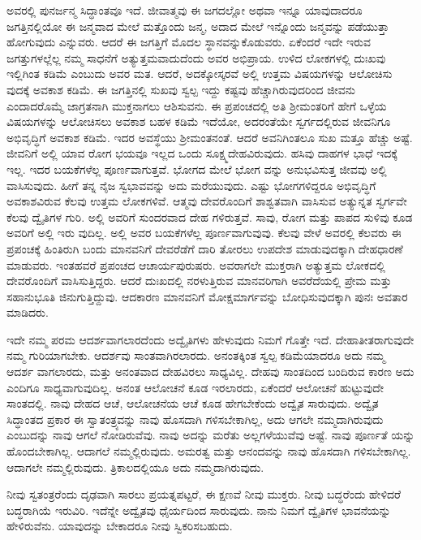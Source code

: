 ಅವರಲ್ಲಿ ಪುನರ್ಜನ್ಮ ಸಿದ್ಧಾಂತವೂ ಇದೆ. ಜೀವಾತ್ಮವು ಈ ಜಗದಲ್ಲೋ ಅಥವಾ ಇನ್ನೂ ಯಾವುದಾದರೂ ಜಗತ್ತಿನಲ್ಲಿಯೋ ಈ ಜನ್ಮವಾದ ಮೇಲೆ ಮತ್ತೊಂದು ಜನ್ಮ, ಅದಾದ ಮೇಲೆ ಇನ್ನೊಂದು ಜನ್ಮವನ್ನು ಪಡೆಯುತ್ತಾ ಹೋಗುವುದು ಎನ್ನುವರು. ಆದರೆ ಈ ಜಗತ್ತಿಗೆ ಮೊದಲ ಸ್ಥಾನವನ್ನುಕೊಡುವರು. ಏಕೆಂದರೆ ಇದೇ ಇರುವ ಜಗತ್ತುಗಳಲ್ಲೆಲ್ಲ ನಮ್ಮ ಸಾಧನೆಗೆ ಅತ್ಯುತ್ತಮವಾದುದೆಂದು ಅವರ ಅಭಿಪ್ರಾಯ. ಉಳಿದ ಲೋಕಗಳಲ್ಲಿ ದುಃಖವು ಇಲ್ಲಿಗಿಂತ ಕಡಿಮೆ ಎಂಬುದು ಅವರ ಮತ. ಆದರೆ, ಅದಕ್ಕೋಸ್ಕರವೆ ಅಲ್ಲಿ ಉತ್ತಮ ವಿಷಯಗಳನ್ನು ಆಲೋಚಿಸು ವುದಕ್ಕೆ ಅವಕಾಶ ಕಡಿಮೆ. ಈ ಜಗತ್ತಿನಲ್ಲಿ ಸುಖವು ಸ್ವಲ್ಪ ಇದ್ದು ಕಷ್ಟವು ಹೆಚ್ಚಾಗಿರುವುದರಿಂದ ಜೀವನು ಎಂದಾದರೊಮ್ಮೆ ಜಾಗ್ರತನಾಗಿ ಮುಕ್ತನಾಗಲು ಆಶಿಸುವನು. ಈ ಪ್ರಪಂಚದಲ್ಲಿ ಅತಿ ಶ‍್ರೀಮಂತರಿಗೆ ಹೇಗೆ ಒಳ್ಳೆಯ ವಿಷಯಗಳನ್ನು ಆಲೋಚಿಸಲು ಅವಕಾಶ ಬಹಳ ಕಡಿಮೆ ಇದೆಯೋ, ಅದರಂತೆಯೇ ಸ್ವರ್ಗದಲ್ಲಿರುವ ಜೀವನಿಗೂ ಅಭಿವೃದ್ಧಿಗೆ ಅವಕಾಶ ಕಡಿಮೆ. ಇದರ ಅವಸ್ಥೆಯು ಶ‍್ರೀಮಂತನಂತೆ. ಆದರೆ ಅವನಿಗಿಂತಲೂ ಸುಖ ಮತ್ತೂ ಹೆಚ್ಚು ಅಷ್ಟೆ. ಜೀವನಿಗೆ ಅಲ್ಲಿ ಯಾವ ರೋಗ ಭಯವೂ ಇಲ್ಲದ ಒಂದು ಸೂಕ್ಷ್ಮದೇಹವಿರುವುದು. ಹಸಿವು ದಾಹಗಳ ಭಾಧೆ ಇದಕ್ಕೆ ಇಲ್ಲ. ಇದರ ಬಯಕೆಗಳೆಲ್ಲ ಪೂರ್ಣವಾಗುತ್ತವೆ. ಭೋಗದ ಮೇಲೆ ಭೋಗ ವನ್ನು ಅನುಭವಿಸುತ್ತ ಜೀವವು ಅಲ್ಲಿ ವಾಸಿಸುವುದು. ಹೀಗೆ ತನ್ನ ನೈಜ ಸ್ವಭಾವವನ್ನು ಅದು ಮರೆಯುವುದು. ಎಷ್ಟು ಭೋಗಗಳಿದ್ದರೂ ಅಭಿವೃದ್ಧಿಗೆ ಅವಕಾಶವಿರುವ ಕೆಲವು ಉತ್ತಮ ಲೋಕಗಳಿವೆ. ಆತ್ಮವು ದೇವರೊಂದಿಗೆ ಶಾಶ್ವತವಾಗಿ ವಾಸಿಸುವ ಅತ್ಯುನ್ನತ ಸ್ವರ್ಗವೇ ಕೆಲವು ದ್ವೈತಿಗಳ ಗುರಿ. ಅಲ್ಲಿ ಅವರಿಗೆ ಸುಂದರವಾದ ದೇಹ ಗಳಿರುತ್ತವೆ. ಸಾವು, ರೋಗ ಮತ್ತು ಪಾಪದ ಸುಳಿವು ಕೂಡ ಅವರಿಗೆ ಅಲ್ಲಿ ಇರು ವುದಿಲ್ಲ. ಅಲ್ಲಿ ಅವರ ಬಯಕೆಗಳೆಲ್ಲ ಪೂರ್ಣವಾಗುವುವು. ಕೆಲವು ವೇಳೆ ಅವರಲ್ಲಿ ಕೆಲವರು ಈ ಪ್ರಪಂಚಕ್ಕೆ ಹಿಂತಿರುಗಿ ಬಂದು ಮಾನವನಿಗೆ ದೇವರೆಡೆಗೆ ದಾರಿ ತೋರಲು ಉಪದೇಶ ಮಾಡುವುದಕ್ಕಾಗಿ ದೇಹಧಾರಣೆ ಮಾಡುವರು. ಇಂತಹವರೆ ಪ್ರಪಂಚದ ಆಚಾರ್ಯಪುರುಷರು. ಅವರಾಗಲೇ ಮುಕ್ತರಾಗಿ ಅತ್ಯುತ್ತಮ ಲೋಕದಲ್ಲಿ ದೇವರೊಂದಿಗೆ ವಾಸಿಸುತ್ತಿದ್ದರು. ಆದರೆ ದುಃಖದಲ್ಲಿ ನರಳುತ್ತಿರುವ ಮಾನವರಿಗಾಗಿ ಅವರೆದೆಯಲ್ಲಿ ಪ್ರೇಮ ಮತ್ತು ಸಹಾನುಭೂತಿ ಜಿನುಗುತ್ತಿದ್ದುವು. ಆದಕಾರಣ ಮಾನವನಿಗೆ ಮೋಕ್ಷಮಾರ್ಗವನ್ನು ಬೋಧಿಸುವುದಕ್ಕಾಗಿ ಪುನಃ ಅವತಾರ ಮಾಡಿದರು.

ಇದೇ ನಮ್ಮ ಪರಮ ಆದರ್ಶವಾಗಲಾರದೆಂದು ಅದ್ವೈತಿಗಳು ಹೇಳುವುದು ನಿಮಗೆ ಗೊತ್ತೇ ಇದೆ. ದೇಹಾತೀತರಾಗುವುದೇ ನಮ್ಮ ಗುರಿಯಾಗಬೇಕು. ಆದರ್ಶವು ಸಾಂತವಾಗಿರಲಾರದು. ಅನಂತಕ್ಕಿಂತ ಸ್ವಲ್ಪ ಕಡಿಮೆಯಾದರೂ ಅದು ನಮ್ಮ ಆದರ್ಶ ವಾಗಲಾರದು, ಮತ್ತು ಅನಂತವಾದ ದೇಹವಿರಲು ಸಾಧ್ಯವಿಲ್ಲ. ದೇಹವು ಸಾಂತದಿಂದ ಬಂದಿರುವ ಕಾರಣ ಅದು ಎಂದಿಗೂ ಸಾಧ್ಯವಾಗುವುದಿಲ್ಲ. ಅನಂತ ಆಲೋಚನೆ ಕೂಡ ಇರಲಾರದು, ಏಕೆಂದರೆ ಆಲೋಚನೆ ಹುಟ್ಟುವುದೇ ಸಾಂತದಲ್ಲಿ. ನಾವು ದೇಹದ ಆಚೆ, ಆಲೋಚನೆಯ ಆಚೆ ಕೂಡ ಹೇಗಬೇಕೆಂದು ಅದ್ವೈತ ಸಾರುವುದು. ಅದ್ವೈತ ಸಿದ್ಧಾಂತದ ಪ್ರಕಾರ ಈ ಸ್ವಾತಂತ್ರ್ಯವನ್ನು ನಾವು ಹೊಸದಾಗಿ ಗಳಿಸಬೇಕಾಗಿಲ್ಲ, ಅದು ಆಗಲೇ ನಮ್ಮದಾಗಿರುವುದು ಎಂಬುದನ್ನು ನಾವು ಆಗಲೆ ನೋಡಿರುವೆವು. ನಾವು ಅದನ್ನು ಮರೆತು ಅಲ್ಲಗಳೆಯುವೆವು ಅಷ್ಟೆ. ನಾವು ಪೂರ್ಣತೆ ಯನ್ನು ಹೊಂದಬೇಕಾಗಿಲ್ಲ. ಆದಾಗಲೆ ನಮ್ಮಲ್ಲಿರುವುದು. ಅಮರತ್ವ ಮತ್ತು ಆನಂದವನ್ನು ನಾವು ಹೊಸದಾಗಿ ಗಳಿಸಬೇಕಾಗಿಲ್ಲ. ಆದಾಗಲೇ ನಮ್ಮಲ್ಲಿರುವುದು. ತ್ರಿಕಾಲದಲ್ಲಿಯೂ ಅದು ನಮ್ಮದಾಗಿರುವುದು.

ನೀವು ಸ್ವತಂತ್ರರೆಂದು ದೃಢವಾಗಿ ಸಾರಲು ಪ್ರಯತ್ನಪಟ್ಟರೆ, ಈ ಕ್ಷಣವೆ ನೀವು ಮುಕ್ತರು. ನೀವು ಬದ್ಧರೆಂದು ಹೇಳಿದರೆ ಬದ್ಧರಾಗಿಯೆ ಇರುವಿರಿ. ಇದೆನ್ನೇ ಅದ್ವೈತವು ಧೈರ್ಯದಿಂದ ಸಾರುವುದು. ನಾನು ನಿಮಗೆ ದ್ವೈತಿಗಳ ಭಾವನೆಯನ್ನು ಹೇಳಿರುವೆನು. ಯಾವುದನ್ನು ಬೇಕಾದರೂ ನೀವು ಸ್ವಿಕರಿಸಬಹುದು.

